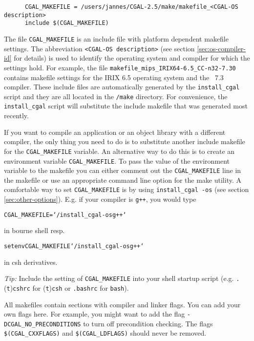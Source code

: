 \begin{verbatim}
      CGAL_MAKEFILE = /users/jannes/CGAL-2.5/make/makefile_<CGAL-OS description>
      include $(CGAL_MAKEFILE)
\end{verbatim}

The file \texttt{CGAL\_MAKEFILE} is an include
file with platform dependent makefile
settings. The abbreviation \texttt{<CGAL-OS description>} (see section
\ref{sec:os-compiler-id} for details) is used to identify the
operating system and compiler for which the settings hold. For
example, the file \texttt{makefile\_mips\_IRIX64-6.5\_CC-n32-7.30}
contains makefile settings for the IRIX 6.5 operating system and the
\mipsprocc\ 7.3 compiler.  These include files are automatically
generated by the \texttt{install\_cgal} script and they are all
located in the \texttt{\cgaldir/make} directory.  For convenience, the
\texttt{install\_cgal} script will substitute the include makefile
that was generated most recently.

If you want to compile an application or an object library with a
different compiler, the only thing you need to do is to substitute
another include makefile for the \texttt{CGAL\_MAKEFILE} variable. An
alternative way to do this is to create an environment variable
\texttt{CGAL\_MAKEFILE}. To pass the value of the environment variable
to the makefile you can either comment out the \texttt{CGAL\_MAKEFILE}
line in the makefile or use an appropriate command line option for the
make utility.  A comfortable way to set \texttt{CGAL\_MAKEFILE} is by
using \texttt{install\_cgal~-os} (see section
\ref{sec:other-options}).  E.g. if your compiler is \texttt{g++}, you
would type
\begin{alltt}
CGAL_MAKEFILE=`\yourcgaldir/install_cgal -os g++`
\end{alltt}
in bourne shell resp.
\begin{alltt}
setenv CGAL_MAKEFILE `\yourcgaldir/install_cgal -os g++`
\end{alltt}
in csh derivatives. 

\textit{Tip:} Include the setting of \texttt{CGAL\_MAKEFILE} into your
shell startup script (e.g. \texttt{.}(\texttt{t})\texttt{cshrc} for
(\texttt{t})\texttt{csh} or \texttt{.bashrc} for \texttt{bash}).

All makefiles contain sections with compiler and linker flags.  You
can add your own flags here. For example, you might want to add the
flag \texttt{-DCGAL\_NO\_PRECONDITIONS} to turn off precondition
checking. The flags \texttt{\$(CGAL\_CXXFLAGS)} and
\texttt{\$(CGAL\_LDFLAGS)} should never be removed.

